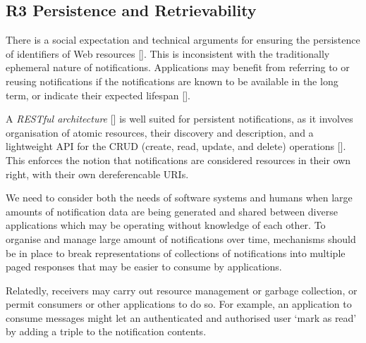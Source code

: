 \documentclass[a4paper]{llncs}
\begin{document}
                            

                            
                                \subsection{R3 Persistence and Retrievability}
  \label{persistence-and-retrievability}

                                
                                    
                                    
									
\par There is a social expectation and technical arguments for ensuring the persistence of identifiers of Web resources []. This is inconsistent with the traditionally ephemeral nature of notifications. Applications may benefit from referring to or reusing notifications if the notifications are known to be available in the long term, or indicate their expected lifespan [].

                                    
\par A {\em RESTful architecture} [] is well suited for persistent notifications, as it involves organisation of atomic resources, their discovery and description, and a lightweight API for the CRUD (create, read, update, and delete) operations []. This enforces the notion that notifications are considered resources in their own right, with their own dereferencable URIs.

                                    
\par We need to consider both the needs of software systems and humans when large amounts of notification data are being generated and shared between diverse applications which may be operating without knowledge of each other. To organise and manage large amount of notifications over time, mechanisms should be in place to break representations of collections of notifications into multiple paged responses that may be easier to consume by applications.

                                    
\par Relatedly, receivers may carry out resource management or garbage collection, or permit consumers or other applications to do so. For example, an application to consume messages might let an authenticated and authorised user ‘mark as read’ by adding a triple to the notification contents.
                                
\end{document}
